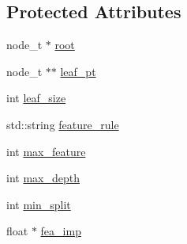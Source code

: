 \subsection*{Protected Attributes}
\begin{DoxyCompactItemize}
\item 
node\+\_\+t $\ast$ \hyperlink{classtree_a1c9d515ea8291ba3e8dd27a32ad11c99}{root}
\item 
node\+\_\+t $\ast$$\ast$ \hyperlink{classtree_a30ebe7c91d8a7c68e05bd40b06867f95}{leaf\+\_\+pt}
\item 
int \hyperlink{classtree_a551919e1402a700821694297623017fc}{leaf\+\_\+size}
\item 
std\+::string \hyperlink{classtree_a5aba3b77a347165517a20d5fab94382d}{feature\+\_\+rule}
\item 
int \hyperlink{classtree_a6f4304318f8f091f7d783ac1ec7d2775}{max\+\_\+feature}
\item 
int \hyperlink{classtree_a0a9f968fac827d3239be67488c34fb21}{max\+\_\+depth}
\item 
int \hyperlink{classtree_ae70cd626c0b50a0b8306a94a9e5e8fd7}{min\+\_\+split}
\item 
float $\ast$ \hyperlink{classtree_ad335e57b2f4f2326825694311bcc69e7}{fea\+\_\+imp}
\end{DoxyCompactItemize}


